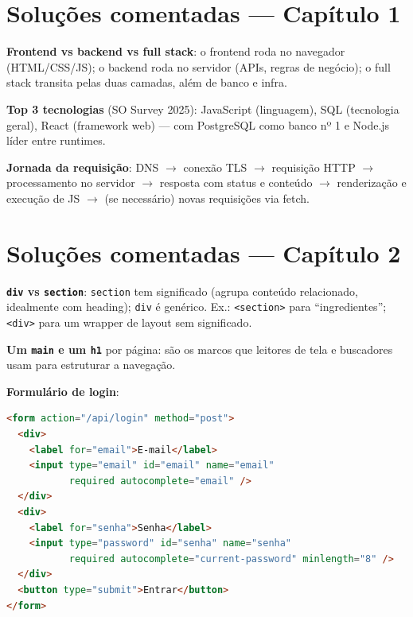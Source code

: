 \section{Soluções comentadas — Capítulo 1}

\begin{exercicios}
  \item \textbf{Frontend vs backend vs full stack}: o frontend roda no
  navegador (HTML/CSS/JS); o backend roda no servidor (APIs, regras de
  negócio); o full stack transita pelas duas camadas, além de banco e infra.
  \item \textbf{Top 3 tecnologias} (SO Survey 2025): JavaScript (linguagem),
  SQL (tecnologia geral), React (framework web) — com PostgreSQL como banco nº 1
  e Node.js líder entre runtimes.
  \item \textbf{Jornada da requisição}: DNS $\rightarrow$ conexão TLS
  $\rightarrow$ requisição HTTP $\rightarrow$ processamento no servidor
  $\rightarrow$ resposta com status e conteúdo $\rightarrow$ renderização e
  execução de JS $\rightarrow$ (se necessário) novas requisições via fetch.
\end{exercicios}

\section{Soluções comentadas — Capítulo 2}

\begin{exercicios}
  \item \textbf{\texttt{div} vs \texttt{section}}: \texttt{section} tem
  significado (agrupa conteúdo relacionado, idealmente com heading); \texttt{div}
  é genérico. Ex.: \texttt{<section>} para ``ingredientes''; \texttt{<div>}
  para um wrapper de layout sem significado.
  \item \textbf{Um \texttt{main} e um \texttt{h1}} por página: são os marcos
  que leitores de tela e buscadores usam para estruturar a navegação.
  \item \textbf{Formulário de login}:
\end{exercicios}

\begin{lstlisting}[style=livro, language=HTML, caption={Solução: formulário de login acessível.}, label={list:sol-login}]
<form action="/api/login" method="post">
  <div>
    <label for="email">E-mail</label>
    <input type="email" id="email" name="email"
           required autocomplete="email" />
  </div>
  <div>
    <label for="senha">Senha</label>
    <input type="password" id="senha" name="senha"
           required autocomplete="current-password" minlength="8" />
  </div>
  <button type="submit">Entrar</button>
</form>
\end{lstlisting}

